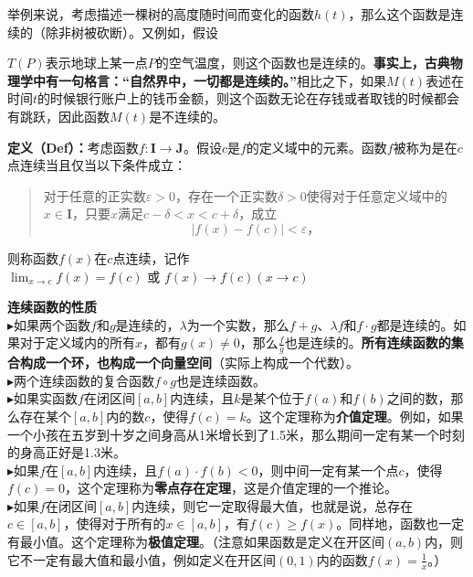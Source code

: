\documentclass[UTF8]{ctexart}
\begin{document}
举例来说，考虑描述一棵树的高度随时间而变化的函数$h(t)$，那么这个函数是连续的（除非树被砍断）。又例如，假设{$T(P)$表示地球上某一点$P$的空气温度，则这个函数也是连续的。\textbf{事实上，古典物理学中有一句格言：“自然界中，一切都是连续的。”}相比之下，如果$M(t)$表述在时间$t$的时候银行账户上的钱币金额，则这个函数无论在存钱或者取钱的时候都会有跳跃，因此函数$M(t)$是不连续的。
\begin{question}
\textbf{定义（Def）：}考虑函数\( f : \mathbf{I} \longrightarrow \mathbf{J} \)。假设$c$是$f$的定义域中的元素。函数$f$被称为是在$c$点连续当且仅当以下条件成立：
\begin{quote}
	对于任意的正实数$ \varepsilon >0 $，存在一个正实数$\delta >0$使得对于任意定义域中的$x \in \mathbf{I}$，只要$x$满足\( c-\delta <x<c+\delta  \)，成立
\begin{equation}
  |f(x)-f(c)| < \varepsilon \text{，}
\end{equation}
\end{quote}
则称函数$f(x)$在$c$点连续，记作\( \lim_{x \to c} f(x) = f(c) \text{ 或 \ }f(x) \to f(c) (x \to c)\)
\end{question}

\begin{info}[Notice:]\textbf{连续函数的性质}\\
	$\blacktriangleright$如果两个函数$f$和$g$是连续的，$ \lambda $为一个实数，那么$ f+g $、$\lambda f$和$ f \cdot g $都是连续的。如果对于定义域内的所有$x$，都有$g(x) \neq 0$，那么$\frac{f}{g}$也是连续的。\textbf{所有连续函数的集合构成一个环，也构成一个向量空间}（实际上构成一个代数）。\\
    $\blacktriangleright$两个连续函数的复合函数$f \circ g$也是连续函数。\\
    $\blacktriangleright$如果实函数$f$在闭区间$[a, b]$内连续，且$k$是某个位于$f(a)$和$f(b)$之间的数，那么存在某个$[ a , b ]$内的数$c$，使得$f ( c ) = k$。这个定理称为\textbf{介值定理}。例如，如果一个小孩在五岁到十岁之间身高从1米增长到了1.5米，那么期间一定有某一个时刻的身高正好是1.3米。\\
    $\blacktriangleright$如果$f$在$[ a , b ]$内连续，且$f ( a ) \cdot f ( b ) < 0$，则中间一定有某一个点$c$，使得$f ( c ) = 0$，这个定理称为\textbf{零点存在定理}，这是介值定理的一个推论。\\
    $\blacktriangleright$如果$f$在闭区间$[ a, b]$内连续，则它一定取得最大值，也就是说，总存在$c \in [ a, b]$，使得对于所有的$x \in [ a, b]$，有$ f ( c ) \geqslant f(x)$。同样地，函数也一定有最小值。这个定理称为\textbf{极值定理}。（注意如果函数是定义在开区间$( a, b)$内，则它不一定有最大值和最小值，例如定义在开区间$(0,1)$内的函数$f ( x ) = \frac{1}{x}$。）
\end{info}
}
\end{document}

